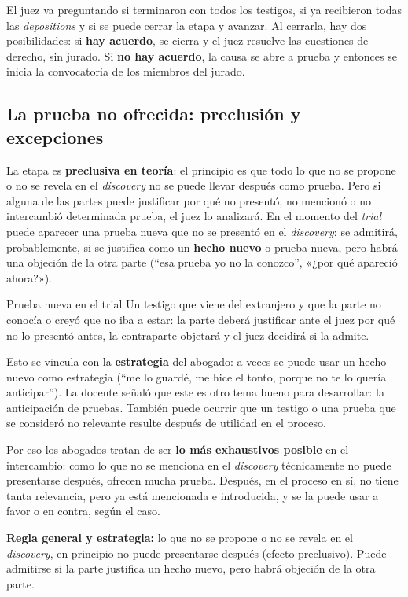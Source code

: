 \documentclass[12pt,oneside]{book}
\begin{document}
El juez va preguntando si terminaron con todos los testigos, si ya recibieron todas las \textit{depositions} y si se puede cerrar la etapa y avanzar. Al cerrarla, hay dos posibilidades: si \textbf{hay acuerdo}, se cierra y el juez resuelve las cuestiones de derecho, sin jurado. Si \textbf{no hay acuerdo}, la causa se abre a prueba y entonces se inicia la convocatoria de los miembros del jurado.

\subsection{La prueba no ofrecida: preclusión y excepciones}

La etapa es \textbf{preclusiva en teoría}: el principio es que todo lo que no se propone o no se revela en el \textit{discovery} no se puede llevar después como prueba. Pero si alguna de las partes puede justificar por qué no presentó, no mencionó o no intercambió determinada prueba, el juez lo analizará. En el momento del \textit{trial} puede aparecer una prueba nueva que no se presentó en el \textit{discovery}: se admitirá, probablemente, si se justifica como un \textbf{hecho nuevo} o prueba nueva, pero habrá una objeción de la otra parte (``esa prueba yo no la conozco'', «¿por qué apareció ahora?»).

\begin{example}{Prueba nueva en el trial}
Un testigo que viene del extranjero y que la parte no conocía o creyó que no iba a estar: la parte deberá justificar ante el juez por qué no lo presentó antes, la contraparte objetará y el juez decidirá si la admite.
\end{example}

Esto se vincula con la \textbf{estrategia} del abogado: a veces se puede usar un hecho nuevo como estrategia (``me lo guardé, me hice el tonto, porque no te lo quería anticipar''). La docente señaló que este es otro tema bueno para desarrollar: la anticipación de pruebas. También puede ocurrir que un testigo o una prueba que se consideró no relevante resulte después de utilidad en el proceso.

Por eso los abogados tratan de ser \textbf{lo más exhaustivos posible} en el intercambio: como lo que no se menciona en el \textit{discovery} técnicamente no puede presentarse después, ofrecen mucha prueba. Después, en el proceso en sí, no tiene tanta relevancia, pero ya está mencionada e introducida, y se la puede usar a favor o en contra, según el caso.

\begin{important}
\textbf{Regla general y estrategia:} lo que no se propone o no se revela en el \textit{discovery}, en principio no puede presentarse después (efecto preclusivo). Puede admitirse si la parte justifica un hecho nuevo, pero habrá objeción de la otra parte.
\end{important}
\end{document}
